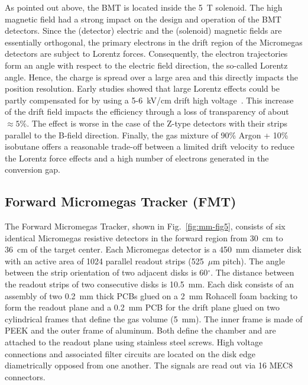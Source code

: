As pointed out above, the BMT is located inside the 5~T solenoid. The high magnetic field had a strong impact on the design and
operation of the BMT detectors. Since the (detector) electric and the (solenoid) magnetic fields are essentially orthogonal, the
primary electrons in the drift region of the Micromegas detectors are subject to Lorentz forces. Consequently, the electron
trajectories form an angle with respect to the electric field direction, the so-called Lorentz angle. Hence, the charge is spread
over a large area and this directly impacts the position resolution. Early studies showed that large Lorentz effects could be
partly compensated for by using a 5-6~kV/cm drift high voltage~\cite{KONCZYKOWSKI2010274}. This increase of the drift
field impacts the efficiency through a loss of transparency of about \(\approx5\%\). The effect is worse in the case of the
Z-type detectors with their strips parallel to the B-field direction. Finally, the gas mixture of 90\% Argon + 10\% isobutane
offers a reasonable trade-off between a limited drift velocity to reduce the Lorentz force effects and a high number of
electrons generated in the conversion gap. 

\subsection{Forward Micromegas Tracker (FMT)}

The Forward Micromegas Tracker, shown in Fig.~\ref{fig:mm-fig5}, consists of six identical Micromegas resistive detectors in
the forward region from 30~cm to 36~cm of the target center. Each Micromegas detector is a 450~mm diameter disk with an
active area of 1024 parallel readout strips (525~$\mu$m pitch). The angle between the strip orientation of two adjacent disks
is 60$^\circ$. The distance between the readout strips of two consecutive disks is 10.5~mm.  Each disk consists of an assembly
of two 0.2~mm thick PCBs glued on a 2~mm Rohacell foam backing to form the readout plane and a 0.2~mm PCB for the drift plane
glued on two cylindrical frames that define the gas volume (5~mm). The inner frame is made of PEEK and the outer frame of
aluminum. Both define the chamber and are attached to the readout plane using stainless steel screws. High voltage connections
and associated filter circuits are located on the disk edge diametrically opposed from one another. The signals are read out via
16 MEC8 connectors.

